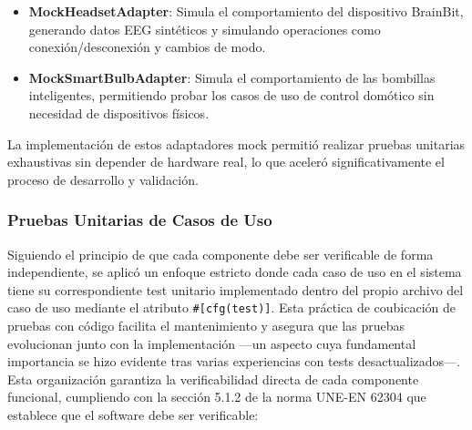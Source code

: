 \begin{itemize}
    \item \textbf{MockHeadsetAdapter}: Simula el comportamiento del dispositivo BrainBit, generando datos EEG sintéticos y simulando operaciones como conexión/desconexión y cambios de modo.
    
    \item \textbf{MockSmartBulbAdapter}: Simula el comportamiento de las bombillas inteligentes, permitiendo probar los casos de uso de control domótico sin necesidad de dispositivos físicos.
\end{itemize}

La implementación de estos adaptadores mock permitió realizar pruebas unitarias exhaustivas sin depender de hardware real, lo que aceleró significativamente el proceso de desarrollo y validación.

\newpage
\subsubsection{Pruebas Unitarias de Casos de Uso}

Siguiendo el principio de que cada componente debe ser verificable de forma independiente, se aplicó un enfoque estricto donde cada caso de uso en el sistema tiene su correspondiente test unitario implementado dentro del propio archivo del caso de uso mediante el atributo \texttt{\#[cfg(test)]}. Esta práctica de coubicación de pruebas con código facilita el mantenimiento y asegura que las pruebas evolucionan junto con la implementación —un aspecto cuya fundamental importancia se hizo evidente tras varias experiencias con tests desactualizados—. Esta organización garantiza la verificabilidad directa de cada componente funcional, cumpliendo con la sección 5.1.2 de la norma UNE-EN 62304 que establece que el software debe ser verificable:

